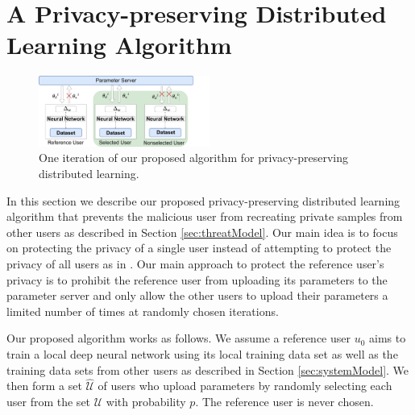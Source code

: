 \documentclass[conference]{IEEEtran}
\begin{document}

\section{A Privacy-preserving Distributed Learning Algorithm}
\begin{figure}[t]
\centering
\includegraphics[width=0.5\textwidth, keepaspectratio]{OurHighLevelApproach.pdf}
\caption{One iteration of our proposed algorithm for privacy-preserving distributed learning.}
\label{fig:HighLevel}
\end{figure}
In this section we describe our proposed privacy-preserving distributed learning algorithm that prevents the malicious user from recreating
private samples from other users as described in Section \ref{sec:threatModel}. 
Our main idea is to focus on protecting the privacy of a single user instead of attempting to protect the privacy of all users as in 
\cite{shokri2015privacy}. Our main approach to protect the reference user's privacy is to prohibit the reference user
from uploading its parameters to the  parameter server and only allow the other users to upload their parameters a limited number of
times at randomly chosen iterations.


Our proposed algorithm works as follows. 
We assume a reference user $u_0$ aims to train a local deep neural network using its local training data set as well as the
training data sets from other users as described in Section \ref{sec:systemModel}.  We then form a set $\hat{\mathcal{{U}}}$ of
users who upload parameters by randomly selecting each user from the set $\mathcal{U}$ with probability $p$. 
The reference user is never chosen.
\end{document}
